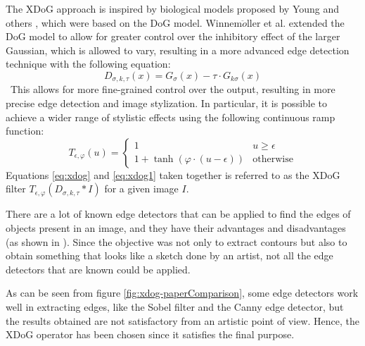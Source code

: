\noindent The XDoG approach is inspired by biological models proposed by Young and others \cite{GaussianDerivativeModel}, which were based on the DoG model. Winnem$\ddot o$ller et al. \cite{RealTimeVideoAbstraction} extended the DoG model to allow for greater control over the inhibitory effect of the larger Gaussian, which is allowed to vary, resulting in a more advanced edge detection technique with the following equation:
\begin{equation}
    D_{\sigma, k,\tau}(x)=G_{\sigma}(x)-\tau \cdot G_{k\sigma}(x)
    \label{eq:xdog}
\end{equation}
 This allows for more fine-grained control over the output, resulting in more precise edge detection and image stylization. In particular, it is possible to achieve a wider range of stylistic effects using the following continuous ramp function:
 \begin{equation}
     T_{\epsilon, \varphi}(u) = 
     \begin{cases}
        1 & u \ge \epsilon \\
        1+ \tanh (\varphi \cdot (u-\epsilon)) & \mbox{otherwise}
    \end{cases}
\label{eq:xdog1}
 \end{equation}
Equations \ref{eq:xdog} and \ref{eq:xdog1} taken together is referred to as the XDoG filter $T_{\epsilon, \varphi}(D_{\sigma, k, \tau }*I)$ for a given image $I$. 

\noindent There are a lot of known edge detectors that can be applied to find the edges of objects present in an image, and they have their advantages and disadvantages (as shown in \cite{xdog}). Since the objective was not only to extract contours but also to obtain something that looks like a sketch done by an artist, not all the edge detectors that are known could be applied. 

\noindent As can be seen from figure \ref{fig:xdog-paperComparison}, some edge detectors work well in extracting edges, like the Sobel filter and the Canny edge detector, but the results obtained are not satisfactory from an artistic point of view. Hence, the XDoG operator has been chosen since it satisfies the final purpose.

